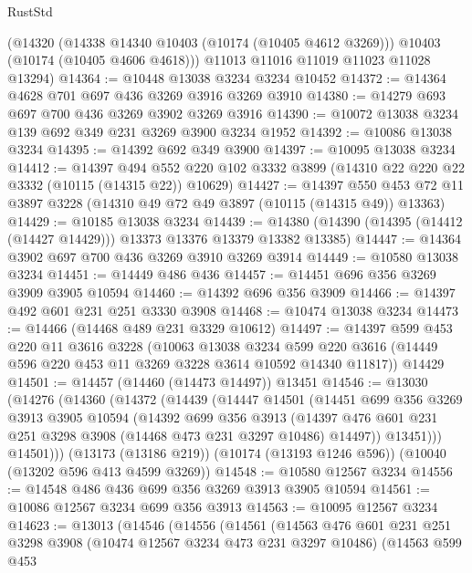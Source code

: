 \begin{lexlean}{RustStd}
\begin{coremodule}
      (@14320
        (@14338 @14340 @10403 (@10174 (@10405 @4612 @3269)))
        @10403
        (@10174 (@10405 @4606 @4618)))
      @11013
      @11016
      @11019
      @11023
      @11028
      @13294)
@14364 := @10448 @13038 @3234 @3234 @10452
@14372 := @14364 @4628 @701 @697 @436 @3269 @3916 @3269 @3910
@14380 := @14279 @693 @697 @700 @436 @3269 @3902 @3269 @3916
@14390 := @10072 @13038 @3234 @139 @692 @349 @231 @3269 @3900 @3234 @1952
@14392 := @10086 @13038 @3234
@14395 := @14392 @692 @349 @3900
@14397 := @10095 @13038 @3234
@14412 := @14397
    @494
    @552
    @220
    @102
    @3332
    @3899
    (@14310 @22 @220 @22 @3332 (@10115 (@14315 @22)) @10629)
@14427 := @14397
    @550
    @453
    @72
    @11
    @3897
    @3228
    (@14310 @49 @72 @49 @3897 (@10115 (@14315 @49)) @13363)
@14429 := @10185 @13038 @3234
@14439 := @14380 (@14390 (@14395 (@14412 (@14427 @14429))) @13373 @13376 @13379 @13382 @13385)
@14447 := @14364 @3902 @697 @700 @436 @3269 @3910 @3269 @3914
@14449 := @10580 @13038 @3234
@14451 := @14449 @486 @436
@14457 := @14451 @696 @356 @3269 @3909 @3905 @10594
@14460 := @14392 @696 @356 @3909
@14466 := @14397 @492 @601 @231 @251 @3330 @3908
@14468 := @10474 @13038 @3234
@14473 := @14466 (@14468 @489 @231 @3329 @10612)
@14497 := @14397
    @599
    @453
    @220
    @11
    @3616
    @3228
    (@10063
      @13038
      @3234
      @599
      @220
      @3616
      (@14449 @596 @220 @453 @11 @3269 @3228 @3614 @10592 @14340 @11817))
    @14429
@14501 := @14457 (@14460 (@14473 @14497)) @13451
@14546 := @13030
    (@14276
      (@14360
        (@14372
          (@14439
            (@14447
              @14501
              (@14451
                @699
                @356
                @3269
                @3913
                @3905
                @10594
                (@14392
                  @699
                  @356
                  @3913
                  (@14397 @476 @601 @231 @251 @3298 @3908 (@14468 @473 @231 @3297 @10486) @14497))
                @13451)))
          @14501)))
    (@13173 (@13186 @219))
    (@10174 (@13193 @1246 @596))
    (@10040 (@13202 @596 @413 @4599 @3269))
@14548 := @10580 @12567 @3234
@14556 := @14548 @486 @436 @699 @356 @3269 @3913 @3905 @10594
@14561 := @10086 @12567 @3234 @699 @356 @3913
@14563 := @10095 @12567 @3234
@14623 := @13013
    (@14546
      (@14556
        (@14561
          (@14563
            @476
            @601
            @231
            @251
            @3298
            @3908
            (@10474 @12567 @3234 @473 @231 @3297 @10486)
            (@14563
              @599
              @453

\end{coremodule}
\end{lexlean}
